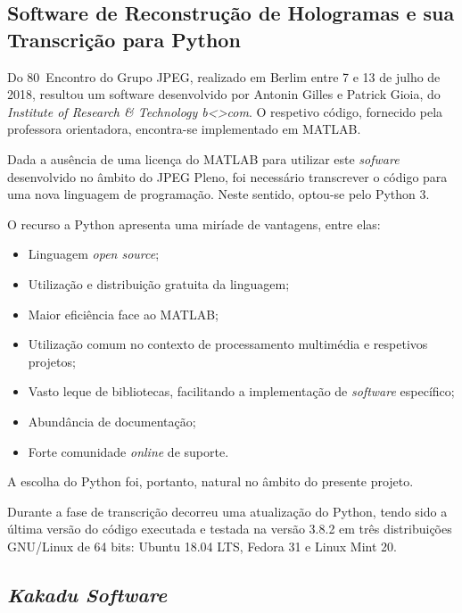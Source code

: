 \subsection{Software de Reconstrução de Hologramas e sua Transcrição para Python}

Do 80\textordmasculine~Encontro do Grupo JPEG, realizado em Berlim entre 7 e 13 de julho de 2018, resultou um software desenvolvido por Antonin Gilles e Patrick Gioia, do \textit{Institute of Research \& Technology b<>com}. O respetivo código, fornecido pela professora orientadora, encontra-se implementado em MATLAB.

Dada a ausência de uma licença do MATLAB para utilizar este \textit{sofware} desenvolvido no âmbito do JPEG Pleno, foi necessário transcrever o código para uma nova linguagem de programação. Neste sentido, optou-se pelo Python 3.


O recurso a Python apresenta uma miríade de vantagens, entre elas:
\begin{itemize}
    \item Linguagem \textit{open source};
    \item Utilização e distribuição gratuita da linguagem;
    \item Maior eficiência face ao MATLAB;
    \item Utilização comum no contexto de processamento multimédia e respetivos projetos;
    \item Vasto leque de bibliotecas, facilitando a implementação de \textit{software} específico;
    \item Abundância de documentação;
    \item Forte comunidade \textit{online} de suporte.
\end{itemize}

A escolha do Python foi, portanto, natural no âmbito do presente projeto.

Durante a fase de transcrição decorreu uma atualização do Python, tendo sido a última versão do código executada e testada na versão 3.8.2 em três distribuições GNU/Linux de 64 bits: Ubuntu 18.04 LTS, Fedora 31 e Linux Mint 20.

\subsection{\textit{Kakadu Software}}

